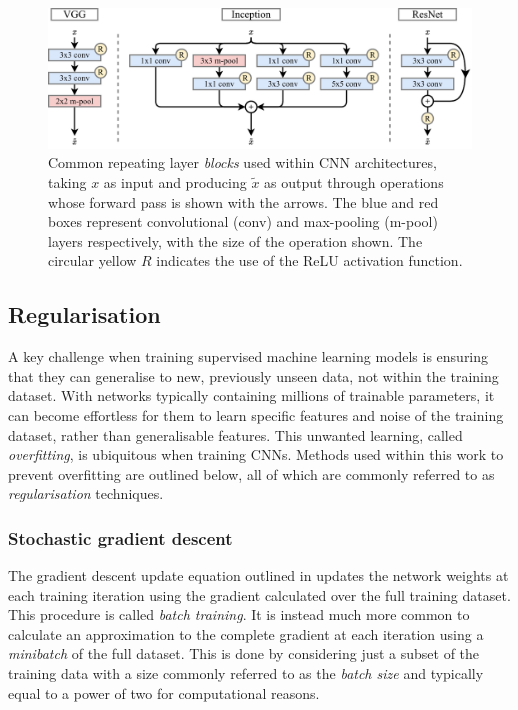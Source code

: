\begin{figure} %
    \includegraphics[width=\textwidth]{diagrams/6-cnn/blocks.pdf}
    \caption[Common Convolutional Neural Network architecture blocks]
    {Common repeating layer \emph{blocks} used within CNN architectures, taking $x$ as input and
        producing $\tilde{x}$ as output through operations whose forward pass is shown with the
        arrows. The blue and red boxes represent convolutional (conv) and max-pooling (m-pool)
        layers respectively, with the size of the operation shown. The circular yellow $R$
        indicates the use of the ReLU activation function.}
    \label{fig:blocks}
\end{figure}

\subsection{Regularisation} %
\label{sec:cnn_theory_reg} %

A key challenge when training supervised machine learning models is ensuring that they can
generalise to new, previously unseen data, not within the training dataset. With networks
typically containing millions of trainable parameters, it can become effortless for them to learn
specific features and noise of the training dataset, rather than generalisable features. This
unwanted learning, called \emph{overfitting}, is ubiquitous when training CNNs. Methods used
within this work to prevent overfitting are outlined below, all of which are commonly referred to
as \emph{regularisation} techniques.

\subsubsection*{Stochastic gradient descent} %

The gradient descent update equation outlined in  updates the network
weights at each training iteration using the gradient calculated over the full training dataset.
This procedure is called \emph{batch training}. It is instead much more common to calculate an
approximation to the complete gradient at each iteration using a \emph{minibatch} of the full
dataset. This is done by considering just a subset of the training data with a size commonly
referred to as the \emph{batch size} and typically equal to a power of two for computational
reasons.

